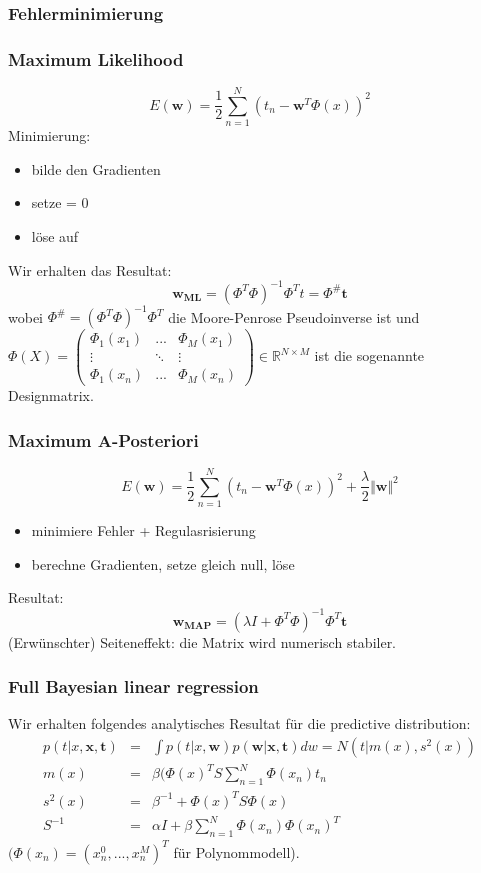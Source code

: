	\subsubsection{Fehlerminimierung}
	\subsubsection{Maximum Likelihood}
	\begin{equation*}
		E(\pmb{w})=\frac{1}{2}\sum_{n=1}^N(t_n-\pmb{w}^T\Phi(x))^2
	\end{equation*}
	Minimierung:
	\begin{itemize}
		\item bilde den Gradienten
		\item setze = 0
		\item löse auf
	\end{itemize}
	Wir erhalten das Resultat:
	\begin{equation*}
		\pmb{w_{ML}} = (\Phi^T\Phi)^{-1}\Phi^Tt=\Phi^\#\pmb{t}
	\end{equation*}
	wobei $\Phi^\#=(\Phi^T\Phi)^{-1}\Phi^T$ die Moore-Penrose Pseudoinverse ist und\\ $\Phi(X)=
	\begin{pmatrix}
		\Phi_1(x_1) & ... & \Phi_M(x_1) \\
		\vdots & \ddots & \vdots \\
		\Phi_1(x_n) & ... & \Phi_M(x_n)
	\end{pmatrix}\in \mathbb{R}^{N\times M}$
	ist die sogenannte Designmatrix.
	\subsubsection{Maximum A-Posteriori}
	\begin{equation*}
		E(\pmb{w})=\frac{1}{2}\sum_{n=1}^N(t_n-\pmb{w}^T\Phi(x))^2+\frac{\lambda}{2}\Vert\pmb{w}\Vert^2
	\end{equation*}
	\begin{itemize}
		\item minimiere Fehler + Regulasrisierung
		\item berechne Gradienten, setze gleich null, löse
	\end{itemize}
	Resultat:
	\begin{equation*}
		\pmb{w_{MAP}} = (\lambda I +\Phi^T\Phi)^{-1}\Phi^T\pmb{t}
	\end{equation*}
	(Erwünschter) Seiteneffekt: die Matrix wird numerisch stabiler.
	\subsubsection{Full Bayesian linear regression}
	Wir erhalten folgendes analytisches Resultat für die predictive distribution:
	\begin{eqnarray*}
		p(t\vert x, \pmb{x}, \pmb{t}) &=& \int p(t\vert x, \pmb{w})p(\pmb{w}\vert \pmb{x}, \pmb{t}) dw = N(t\vert m(x), s^2(x))\\
		m(x) &=& \beta(\Phi(x)^TS\sum_{n=1}^N\Phi(x_n)t_n\\
		s^2(x) &=& \beta^{-1}+\Phi(x)^TS\Phi(x)\\
		S^{-1} &=& \alpha I + \beta\sum_{n=1}^N\Phi(x_n)\Phi(x_n)^T
	\end{eqnarray*}
	$(\Phi(x_n)=(x_n^0, ..., x_n^M)^T$ für Polynommodell).
